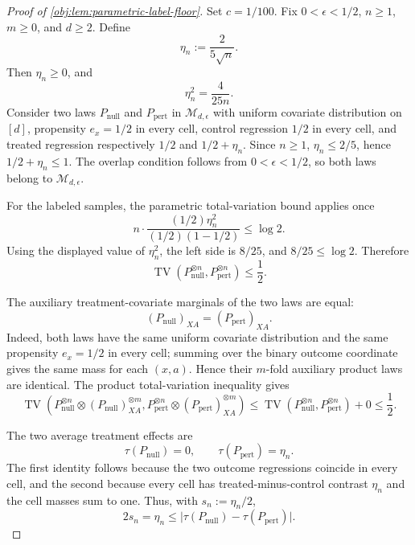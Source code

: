 \begin{proof}[Proof of \cref{obj:lem:parametric-label-floor}]
Set \(c=1/100\). Fix \(0<\epsilon<1/2\), \(n\ge1\), \(m\ge0\), and \(d\ge2\). Define
\[
\eta_n:=\frac{2}{5\sqrt n}.
\]
Then \(\eta_n\ge0\), and
\[
\eta_n^2=\frac{4}{25n}.
\]
Consider two laws \(P_{\mathrm{null}}\) and \(P_{\mathrm{pert}}\) in \(\mathcal M_{d,\epsilon}\) with uniform covariate distribution on \([d]\), propensity \(e_x=1/2\) in every cell, control regression \(1/2\) in every cell, and treated regression respectively \(1/2\) and \(1/2+\eta_n\). Since \(n\ge1\), \(\eta_n\le2/5\), hence \(1/2+\eta_n\le1\). The overlap condition follows from \(0<\epsilon<1/2\), so both laws belong to \(\mathcal M_{d,\epsilon}\). %

For the labeled samples, the parametric total-variation bound applies once
\[
n\cdot \frac{(1/2)\eta_n^2}{(1/2)(1-1/2)}\le \log 2 .
\]
Using the displayed value of \(\eta_n^2\), the left side is \(8/25\), and \(8/25\le \log 2\). Therefore
\[
\operatorname{TV}\!\left(P_{\mathrm{null}}^{\otimes n},
P_{\mathrm{pert}}^{\otimes n}\right)\le \frac12 .
\]

The auxiliary treatment-covariate marginals of the two laws are equal:
\[
(P_{\mathrm{null}})_{XA}=(P_{\mathrm{pert}})_{XA}.
\]
Indeed, both laws have the same uniform covariate distribution and the same propensity \(e_x=1/2\) in every cell; summing over the binary outcome coordinate gives the same mass for each \((x,a)\). Hence their \(m\)-fold auxiliary product laws are identical. The product total-variation inequality gives
\[
\operatorname{TV}\!\left(
P_{\mathrm{null}}^{\otimes n}\otimes (P_{\mathrm{null}})_{XA}^{\otimes m},
P_{\mathrm{pert}}^{\otimes n}\otimes (P_{\mathrm{pert}})_{XA}^{\otimes m}
\right)
\le
\operatorname{TV}\!\left(P_{\mathrm{null}}^{\otimes n},P_{\mathrm{pert}}^{\otimes n}\right)+0
\le \frac12 .
\]

The two average treatment effects are
\[
\tau(P_{\mathrm{null}})=0,
\qquad
\tau(P_{\mathrm{pert}})=\eta_n.
\]
The first identity follows because the two outcome regressions coincide in every cell, and the second because every cell has treated-minus-control contrast \(\eta_n\) and the cell masses sum to one. Thus, with \(s_n:=\eta_n/2\),
\[
2s_n=\eta_n
\le
\bigl|\tau(P_{\mathrm{null}})-\tau(P_{\mathrm{pert}})\bigr|.
\]


\end{proof}
